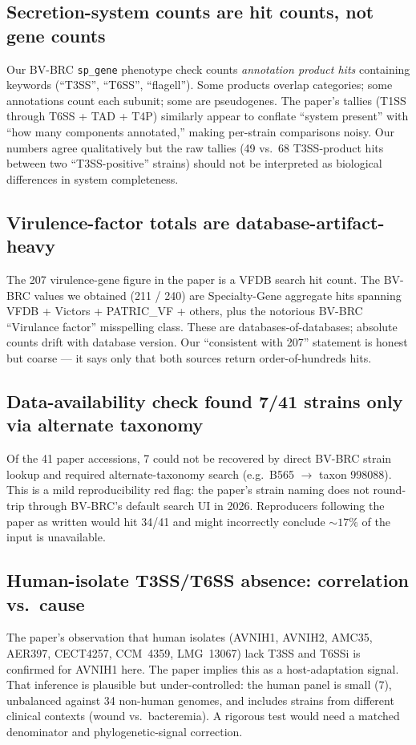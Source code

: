 \documentclass[11pt]{article}
\begin{document}
\subsection{Secretion-system counts are hit counts, not gene counts}
Our BV-BRC \texttt{sp\_gene} phenotype check counts \emph{annotation product
hits} containing keywords (``T3SS'', ``T6SS'', ``flagell''). Some products
overlap categories; some annotations count each subunit; some are pseudogenes.
The paper's tallies (T1SS through T6SS + TAD + T4P) similarly appear to
conflate ``system present'' with ``how many components annotated,'' making
per-strain comparisons noisy. Our numbers agree qualitatively but the raw
tallies (49 vs.\ 68 T3SS-product hits between two ``T3SS-positive'' strains)
should not be interpreted as biological differences in system completeness.

\subsection{Virulence-factor totals are database-artifact-heavy}
The 207 virulence-gene figure in the paper is a VFDB search hit count. The
BV-BRC values we obtained (211 / 240) are Specialty-Gene aggregate hits
spanning VFDB + Victors + PATRIC\_VF + others, plus the notorious BV-BRC
``Virulance factor'' misspelling class. These are databases-of-databases;
absolute counts drift with database version. Our ``consistent with 207''
statement is honest but coarse --- it says only that both sources return
order-of-hundreds hits.

\subsection{Data-availability check found 7/41 strains only via alternate
taxonomy}
Of the 41 paper accessions, 7 could not be recovered by direct BV-BRC strain
lookup and required alternate-taxonomy search (e.g.\ B565 $\rightarrow$ taxon
998088). This is a mild reproducibility red flag: the paper's strain naming
does not round-trip through BV-BRC's default search UI in 2026. Reproducers
following the paper as written would hit 34/41 and might incorrectly conclude
$\sim 17\%$ of the input is unavailable.

\subsection{Human-isolate T3SS/T6SS absence: correlation vs.\ cause}
The paper's observation that human isolates (AVNIH1, AVNIH2, AMC35, AER397,
CECT4257, CCM~4359, LMG~13067) lack T3SS and T6SSi is confirmed for AVNIH1
here. The paper implies this as a host-adaptation signal. That inference is
plausible but under-controlled: the human panel is small (7), unbalanced
against 34 non-human genomes, and includes strains from different clinical
contexts (wound vs.\ bacteremia). A rigorous test would need a matched
denominator and phylogenetic-signal correction.
\end{document}
